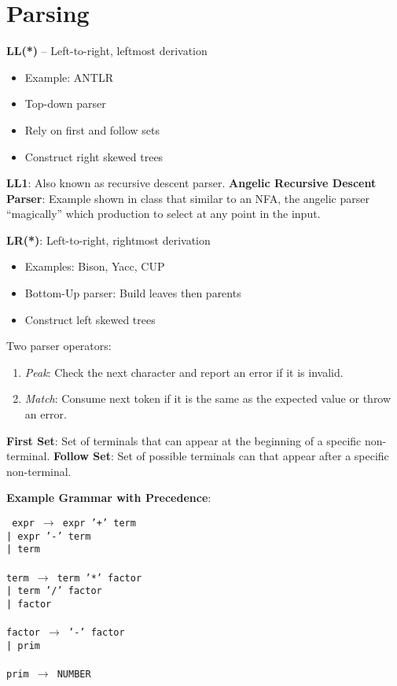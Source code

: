 \documentclass[10pt,twocolumn]{report}
\begin{document}
\section{Parsing}

\textbf{LL(*)} -- Left-to-right, leftmost derivation
\begin{itemize}
  \item Example: ANTLR
  \item Top-down parser
  \item Rely on first and follow sets
  \item Construct right skewed trees
\end{itemize}
\textbf{LL1}: Also known as recursive descent parser.
\textbf{Angelic Recursive Descent Parser}: Example shown in class that similar to an NFA, the angelic parser ``magically'' which production to select at any point in the input.

\textbf{LR(*)}: Left-to-right, rightmost derivation
\begin{itemize}
  \item Examples: Bison, Yacc, CUP
  \item Bottom-Up parser: Build leaves then parents
  \item Construct left skewed trees
\end{itemize}

Two parser operators:
\begin{enumerate}
  \item \textit{Peak}: Check the next character and report an error if it is invalid.
  \item \textit{Match}: Consume next token if it is the same as the expected value or throw an error.
\end{enumerate}

\textbf{First Set}: Set of terminals that can appear at the beginning of a specific non-terminal. \textbf{Follow Set}: Set of possible terminals can that appear after a specific non-terminal.

\textbf{Example Grammar with Precedence}:

\texttt{%
  expr $\rightarrow$ expr '+' term\\
  \hbox{\hspace{30pt}}| expr '-' term\\
  \hbox{\hspace{30pt}}| term\\
  \\
  term $\rightarrow$ term '*' factor\\
  \hbox{\hspace{30pt}}| term '/' factor\\
  \hbox{\hspace{30pt}}| factor\\
  \\
  factor $\rightarrow$ '-' factor\\
  \hbox{\hspace{39pt}}| prim\\
  \\
  prim $\rightarrow$ NUMBER
}
\end{document}
